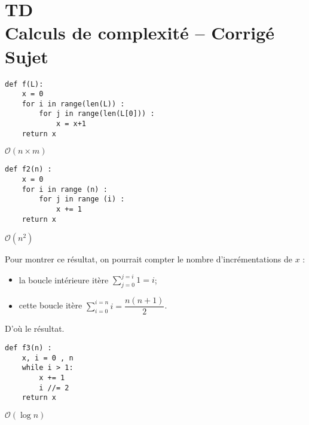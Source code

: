 \chapter*{TD  \\ 
Calculs de complexité -- 
\ifprof Corrigé \else Sujet \fi}

\iflivret {} \else
\ifprof  {} \else \fi
\fi

\setcounter{question}{0}





\begin{lstlisting}
def f(L):
    x = 0
    for i in range(len(L)) :
        for j in range(len(L[0])) :
            x = x+1
    return x
\end{lstlisting}
\ifprof
\begin{corrige}
$\mathcal{O}(n\times m)$
\end{corrige}
\else
\fi



\begin{lstlisting}
def f2(n) :
    x = 0
    for i in range (n) :
        for j in range (i) :
            x += 1
    return x
\end{lstlisting}
\ifprof
\begin{corrige}
$\mathcal{O}(n^2)$

Pour montrer ce résultat, on pourrait compter le nombre d'incrémentations de $x$ :
\begin{itemize}
\item la boucle intérieure itère $\sum_{j=0}^{j=i} 1 = i$;
\item cette boucle itère $\sum\limits_{i=0}^{i=n} i = \dfrac{n\left(n+1\right)}{2} $.
\end{itemize}
D'où le résultat.
\end{corrige}
\else
\fi



\begin{lstlisting}
def f3(n) :
    x, i = 0 , n
    while i > 1:
        x += 1
        i //= 2
    return x
\end{lstlisting}
\ifprof
\begin{corrige}
$\mathcal{O}(\log n)$
\end{corrige}
\else
\fi



